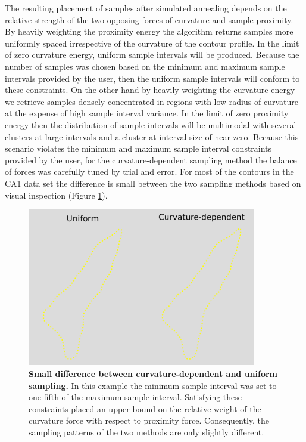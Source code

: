 \documentclass[12pt]{article}
\begin{document}
The resulting placement of samples after simulated annealing depends
on the relative strength of the two opposing forces of curvature and
sample proximity. By heavily weighting the proximity energy the algorithm
returns samples more uniformly spaced irrespective of the curvature of
the contour profile. In the limit of zero curvature energy, uniform
sample intervals will be produced. Because the number of samples was
chosen based on the minimum and maximum sample intervals provided
by the user, then the uniform sample intervals will conform to these
constraints. On the other hand by heavily weighting the curvature energy
we retrieve samples densely concentrated in regions with low radius of
curvature at the expense of high sample interval variance. In the limit
of zero proximity energy then the distribution of sample intervals will
be multimodal with several clusters at large intervals and a cluster at
interval size of near zero. Because this scenario violates the minimum
and maximum sample interval constraints provided by the user, for the
curvature-dependent sampling method the balance of forces was carefully
tuned by trial and error. For most of the contours in the CA1 data set
the difference is small between the two sampling methods based on visual
inspection (Figure \ref{fig:uniform_vs_curvature_dependent}).

\begin{figure}[htb]
  \begin{center}
    \includegraphics[width=10cm]{figures/uniform_vs_curvature_dependent.pdf}
    \caption{\textbf{Small difference between curvature-dependent and
    uniform sampling.} In this example the minimum sample interval was
    set to one-fifth of the maximum sample interval. Satisfying these
    constraints placed an upper bound on the relative weight of the
    curvature force with respect to proximity force. Consequently, the
    sampling patterns of the two methods are only slightly different.}
    \label{fig:uniform_vs_curvature_dependent}
  \end{center}
\end{figure}
\end{document}
